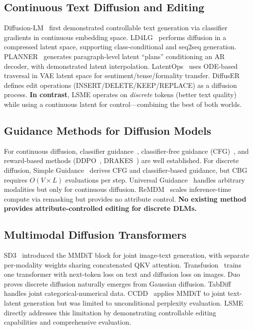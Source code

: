 \documentclass{article}
\begin{document}
\subsection{Continuous Text Diffusion and Editing}

Diffusion-LM~\citep{li2022} first demonstrated controllable text generation via classifier gradients in continuous embedding space.
LD4LG~\citep{lovelace2023} performs diffusion in a compressed latent space, supporting class-conditional and seq2seq generation.
PLANNER~\citep{zhang2023} generates paragraph-level latent ``plans'' conditioning an AR decoder, with demonstrated latent interpolation.
LatentOps~\citep{liu2023latentops} uses ODE-based traversal in VAE latent space for sentiment/tense/formality transfer.
DiffusER~\citep{reid2023} defines edit operations (INSERT/DELETE/KEEP/REPLACE) as a diffusion process.
\textbf{In contrast}, LSME operates on \emph{discrete} tokens (better text quality) while using a continuous latent for control---combining the best of both worlds.

\subsection{Guidance Methods for Diffusion Models}

For continuous diffusion, classifier guidance~\citep{dhariwal2021}, classifier-free guidance (CFG)~\citep{ho2022}, and reward-based methods (DDPO~\citep{black2024}, DRAKES~\citep{wang2025}) are well established.
For discrete diffusion, Simple Guidance~\citep{nisonoff2025} derives CFG and classifier-based guidance, but CBG requires $O(V \times L)$ evaluations per step.
Universal Guidance~\citep{bansal2024} handles arbitrary modalities but only for continuous diffusion.
ReMDM~\citep{arriola2025remdm} scales inference-time compute via remasking but provides no attribute control.
\textbf{No existing method provides attribute-controlled editing for discrete DLMs.}

\subsection{Multimodal Diffusion Transformers}

SD3~\citep{esser2024} introduced the MMDiT block for joint image-text generation, with separate per-modality weights sharing concatenated QKV attention.
Transfusion~\citep{zhou2025transfusion} trains one transformer with next-token loss on text and diffusion loss on images.
Duo~\citep{sahoo2025duo} proves discrete diffusion naturally emerges from Gaussian diffusion.
TabDiff~\citep{xu2025tabdiff} handles joint categorical-numerical data.
CCDD~\citep{zhou2025ccdd} applies MMDiT to joint text-latent generation but was limited to unconditional perplexity evaluation.
LSME directly addresses this limitation by demonstrating controllable editing capabilities and comprehensive evaluation.
\end{document}
